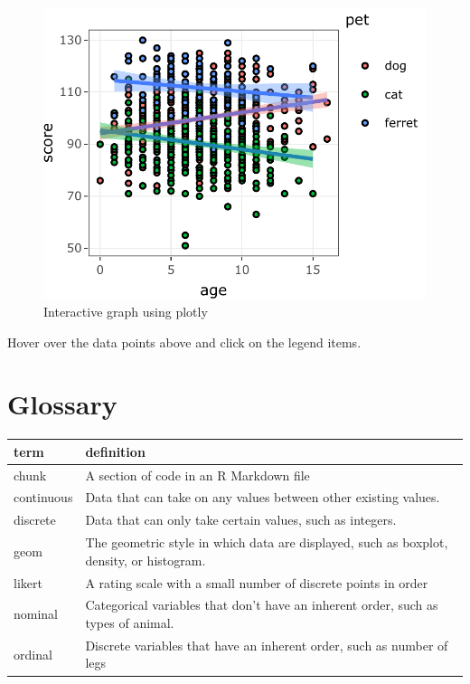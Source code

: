 \documentclass[
  oneside]{book}
\begin{document}
\begin{figure}

{\centering \includegraphics[width=0.9\linewidth]{images/plotly-1} 

}

\caption{Interactive graph using plotly}\label{fig:plotly}
\end{figure}

\begin{info}
Hover over the data points above and click on the legend items.

\end{info}

\hypertarget{glossary-ggplot}{%
\section{Glossary}\label{glossary-ggplot}}

\begin{tabular}{l|l}
\hline
term & definition\\
\hline
chunk & A section of code in an R Markdown file\\
\hline
continuous & Data that can take on any values between other existing values.\\
\hline
discrete & Data that can only take certain values, such as integers.\\
\hline
geom & The geometric style in which data are displayed, such as boxplot, density, or histogram.\\
\hline
likert & A rating scale with a small number of discrete points in order\\
\hline
nominal & Categorical variables that don’t have an inherent order, such as types of animal.\\
\hline
ordinal & Discrete variables that have an inherent order, such as number of legs\\
\hline
\end{tabular}
\end{document}
